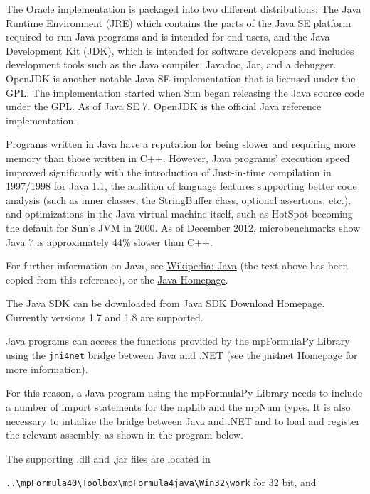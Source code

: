 \vpara
The Oracle implementation is packaged into two different distributions: The Java Runtime Environment (JRE) which contains the parts of the Java SE platform required to run Java programs and is intended for end-users, and the Java Development Kit (JDK), which is intended for software developers and includes development tools such as the Java compiler, Javadoc, Jar, and a debugger. OpenJDK is another notable Java SE implementation that is licensed under the GPL. The implementation started when Sun began releasing the Java source code under the GPL. As of Java SE 7, OpenJDK is the official Java reference implementation.

\vpara
Programs written in Java have a reputation for being slower and requiring more memory than those written in C++. However, Java programs' execution speed improved significantly with the introduction of Just-in-time compilation in 1997/1998 for Java 1.1, the addition of language features supporting better code analysis (such as inner classes, the StringBuffer class, optional assertions, etc.), and optimizations in the Java virtual machine itself, such as HotSpot becoming the default for Sun's JVM in 2000. As of December 2012, microbenchmarks show Java 7 is approximately 44\% slower than C++. 

\vpara
For further information on Java, see \href{http://en.wikipedia.org/wiki/Java_(programming_language)}{Wikipedia: Java} (the text above has been copied from this reference), or the  \href{http://www.java.com/en/}{Java Homepage}.

\vpara
The Java SDK can be downloaded from \href{http://www.oracle.com/technetwork/java/javase/downloads/index.html}{Java SDK Download Homepage}. Currently versions 1.7 and 1.8 are supported. 

Java programs can access the functions provided by the mpFormulaPy Library using the \verb|jni4net| bridge between Java and .NET (see the \href{http://jni4net.sourceforge.net/index.shtml}{jni4net Homepage} for more information). 

For this reason, a Java program using the mpFormulaPy Library needs to include a number of import statements for the mpLib and the mpNum types. It is also necessary to intialize the bridge between Java and .NET and to load and register the relevant assembly, as shown in the program below.

\vpara
The supporting .dll and .jar files are located in 

\verb|..\mpFormula40\Toolbox\mpFormula4java\Win32\work| for 32 bit, and 


